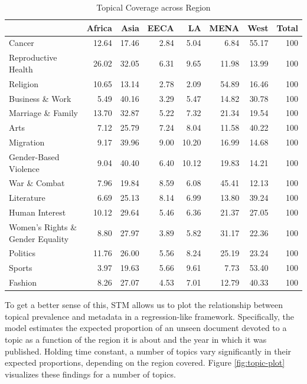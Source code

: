 \documentclass[11pt, oneside]{article}
\newcommand\T{\rule{0pt}{2.6ex}}       %
\newcommand\B{\rule[-1.2ex]{0pt}{0pt}} %
\begin{document}
\begin{table}[ht]
\centering
\caption{Topical Coverage across Region}\label{table:region-distr}
\begin{tabular}{lrrrrrrr}
  \hline
 & Africa & Asia & EECA & LA & MENA & West & Total \T\B \\  
  \hline
Cancer & 12.64 & 17.46 & 2.84 & 5.04 & 6.84 & 55.17 & 100 \\ 
  Reproductive Health & 26.02 & 32.05 & 6.31 & 9.65 & 11.98 & 13.99 & 100 \\ 
  Religion & 10.65 & 13.14 & 2.78 & 2.09 & 54.89 & 16.46 & 100 \\ 
  Business \& Work & 5.49 & 40.16 & 3.29 & 5.47 & 14.82 & 30.78 & 100 \\ 
  Marriage \& Family & 13.70 & 32.87 & 5.22 & 7.32 & 21.34 & 19.54 & 100 \\ 
  Arts & 7.12 & 25.79 & 7.24 & 8.04 & 11.58 & 40.22 & 100 \\ 
  Migration & 9.17 & 39.96 & 9.00 & 10.20 & 16.99 & 14.68 & 100 \\ 
  Gender-Based Violence & 9.04 & 40.40 & 6.40 & 10.12 & 19.83 & 14.21 & 100 \\ 
  War \& Combat & 7.96 & 19.84 & 8.59 & 6.08 & 45.41 & 12.13 & 100 \\ 
  Literature & 6.69 & 25.13 & 8.14 & 6.99 & 13.80 & 39.24 & 100 \\ 
  Human Interest & 10.12 & 29.64 & 5.46 & 6.36 & 21.37 & 27.05 & 100 \\ 
  Women's Rights \& Gender Equality & 8.80 & 27.97 & 3.89 & 5.82 & 31.17 & 22.36 & 100 \\ 
  Politics & 11.76 & 26.00 & 5.56 & 8.24 & 25.19 & 23.24 & 100 \\ 
  Sports & 3.97 & 19.63 & 5.66 & 9.61 & 7.73 & 53.40 & 100 \\ 
  Fashion & 8.26 & 27.07 & 4.53 & 7.01 & 12.79 & 40.33 & 100 \\ 
   \hline
\end{tabular}
\end{table}

To get a better sense of this, STM allows us to plot the relationship between topical prevalence and metadata in a regression-like framework. Specifically, the model estimates the expected proportion of an unseen document devoted to a topic as a function of the region it is about and the year in which it was published. Holding time constant, a number of topics vary significantly in their expected proportions, depending on the region covered. Figure \ref{fig:topic-plot} visualizes these findings for a number of topics.
\end{document}
